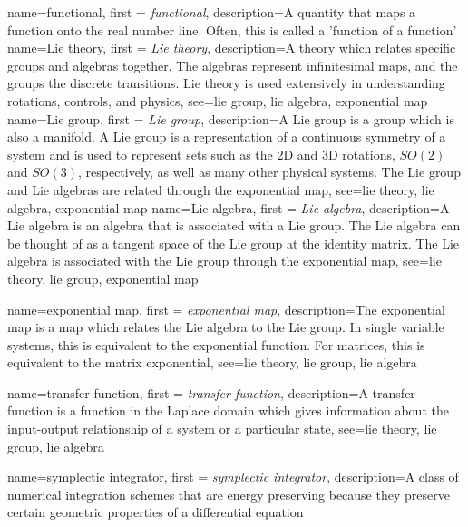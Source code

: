 {
    name=functional,
    first = {\textit{functional}},
    description={A quantity that maps a function onto the real number line. Often,  this is called a 'function of a function'}
}
{
    name=Lie theory,
    first = {\textit{Lie theory}},
    description={A theory which relates specific groups and algebras together. The algebras represent infinitesimal maps, and the groups the discrete transitions. Lie theory is used extensively in understanding rotations, controls, and physics},
    see={lie group, lie algebra, exponential map}
}
{
    name=Lie group,
    first = {\textit{Lie group}},
    description={A Lie group is a group which is also a manifold. A Lie group is a representation of a continuous symmetry of a system and is used to represent sets such as the 2D and 3D rotations, $SO(2)$ and $SO(3)$, respectively, as well as many other physical systems. The Lie group  and Lie algebras are related through the exponential map},
    see={lie theory, lie algebra, exponential map}
}
{
    name=Lie algebra,
    first = {\textit{Lie algebra}},
    description={A Lie algebra is an algebra that is associated with a Lie group. The Lie algebra can be thought of as a tangent space of the Lie group at the identity matrix. The Lie algebra is associated with the Lie group through the exponential map},
    see={lie theory, lie group, exponential map}
}

{
    name=exponential map,
    first = {\textit{exponential map}},
    description={The exponential map is a map which relates the Lie algebra to the Lie group. In single variable systems, this is equivalent to the exponential function. For matrices, this is equivalent to the matrix exponential},
    see={lie theory, lie group, lie algebra}
}

{
    name=transfer function,
    first = {\textit{transfer function}},
    description={A transfer function is a function in the Laplace domain which gives information about the input-output relationship of a system or a particular state},
    see={lie theory, lie group, lie algebra}
}

{
    name=symplectic integrator,
    first = {\textit{symplectic integrator}},
    description={A class of numerical integration schemes that are energy preserving because they preserve certain geometric properties of a differential equation}
}


